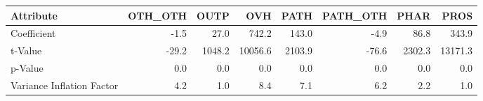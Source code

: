 \begin{tabular}{lrrrrrrr}
\toprule
Attribute &  OTH\_OTH &    OUTP &      OVH &    PATH &  PATH\_OTH &    PHAR &     PROS \\
\midrule
Coefficient               &     -1.5 &    27.0 &    742.2 &   143.0 &      -4.9 &    86.8 &    343.9 \\
t-Value                   &    -29.2 &  1048.2 &  10056.6 &  2103.9 &     -76.6 &  2302.3 &  13171.3 \\
p-Value                   &      0.0 &     0.0 &      0.0 &     0.0 &       0.0 &     0.0 &      0.0 \\
Variance Inflation Factor &      4.2 &     1.0 &      8.4 &     7.1 &       6.2 &     2.2 &      1.0 \\
\bottomrule
\end{tabular}
